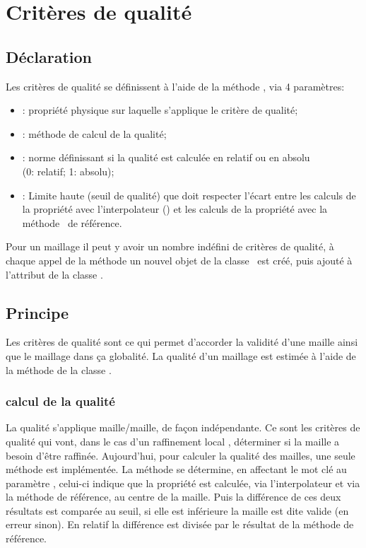       \section{Critères de qualité}\label{qualite}
	\subsection{Déclaration}
	Les critères de qualité se définissent à l'aide de la méthode , via 4 paramètres:
	\vspace{0.3cm}
	\begin{itemize}
	 \item {}: propriété physique sur laquelle s'applique le critère de qualité;
	 \item {}: méthode de calcul de la qualité;
	 \item {}: norme définissant si la qualité est calculée en relatif ou en absolu\\ (0: relatif; 1: absolu);
	 \item {}: Limite haute (seuil de qualité) que doit respecter l'écart entre
	 les calculs de la propriété avec l'interpolateur (\IPP) et les calculs de la propriété avec la méthode \EOS\ de référence.
	\end{itemize}
	\smallbreak
	\vspace{0.5cm}
	Pour un maillage il peut y avoir un nombre indéfini de critères de qualité, 
	à chaque appel de la méthode  un nouvel objet de la classe \QI\ est créé, puis ajouté à 
	l'attribut  de la classe \IGEN.
	
	
      \subsection{Principe}
      
      Les critères de qualité sont ce qui permet d'accorder la validité d'une maille
      ainsi que le maillage dans ça globalité.
      La qualité d'un maillage est estimée à l'aide de la méthode  de la classe \IGEN.
      
      \subsubsection{calcul de la qualité}
      
      La qualité s'applique maille/maille, de façon indépendante.
      Ce sont les critères de qualité qui vont, dans le cas d'un raffinement
      local , déterminer si la maille a besoin d'être raffinée.
      \smallbreak\vspace{0.3cm}
      Aujourd'hui, pour calculer la qualité des mailles, une seule méthode est implémentée.
      La méthode se détermine, en affectant le mot clé  au paramètre ,
      celui-ci indique que la propriété est calculée, via l'interpolateur et via la méthode de référence,
      au centre de la maille. Puis la différence de ces deux résultats est comparée au seuil, si elle est inférieure la maille
      est dite valide (en erreur sinon). En relatif la différence est divisée par le résultat de la méthode de référence.

